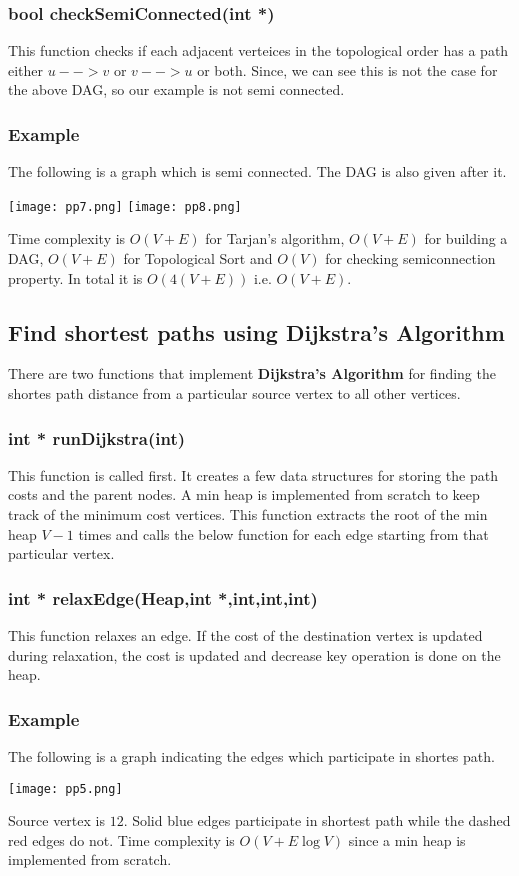 \documentclass{article}
\begin{document}
\subsubsection{bool checkSemiConnected(int *)}
This function checks if each adjacent verteices in the topological order has a path either $u-->v$ or $v-->u$ or both.\newline
Since, we can see this is not the case for the above DAG, so our example is not semi connected.
\subsubsection{Example}
The following is a graph which is semi connected. The DAG is also given after it.
\begin{center}
\texttt{[image: pp7.png]}
\texttt{[image: pp8.png]}
\end{center}
Time complexity is $O(V+E)$ for Tarjan's algorithm, $O(V+E)$ for building a DAG, $O(V+E)$ for Topological Sort and $O(V)$ for checking semiconnection property. In total it is $O(4(V+E))$ i.e. $O(V+E)$.

\subsection{Find shortest paths using Dijkstra's Algorithm}
There are two functions that implement \textbf{Dijkstra's Algorithm} for finding the shortes path distance from a particular source vertex to all other vertices.
\subsubsection{int * runDijkstra(int)}
This function is called first. It creates a few data structures for storing the path costs and the parent nodes. A min heap is implemented from scratch to keep track of the minimum cost vertices. This function extracts the root of the min heap $V-1$ times and calls the below function for each edge starting from that particular vertex.
\subsubsection{int * relaxEdge(Heap,int *,int,int,int)}
This function relaxes an edge. If the cost of the destination vertex is updated during relaxation, the cost is updated and decrease key operation is done on the heap.
\subsubsection{Example}
The following is a graph indicating the edges which participate in shortes path.
\begin{center}
\texttt{[image: pp5.png]}
\end{center}
Source vertex is $12$. Solid blue edges participate in shortest path while the dashed red edges do not.\newline
Time complexity is $O(V+E\log V)$ since a min heap is implemented from scratch.
\end{document}
